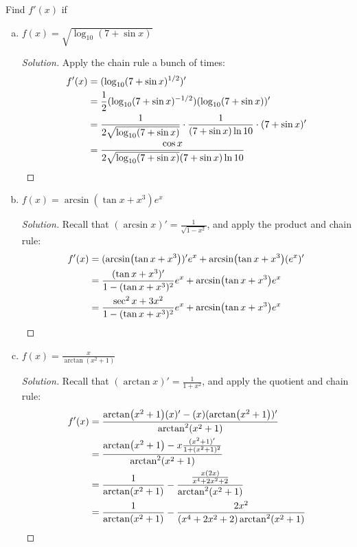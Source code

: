 \question Find $f'(x)$ if
\begin{enumerate}[(a)]
  \item $f(x)=\sqrt{\log_{10}(7+\sin x)}$
        \begin{proof}[Solution]
          Apply the chain rule a bunch of times:
          \begin{align*}
            f'(x) & = (\log_{10}(7+\sin x)^{1/2})'                                                         \\
                  & = \frac12(\log_{10}(7+\sin x)^{-1/2})(\log_{10}(7+\sin x))'                            \\
                  & = \frac{1}{2\sqrt{\log_{10}(7+\sin x)}}\cdot\frac{1}{(7+\sin x)\ln 10}\cdot(7+\sin x)' \\
                  & = \frac{\cos x}{2\sqrt{\log_{10}(7+\sin x)}(7+\sin x)\ln 10} \qedhere
          \end{align*}
        \end{proof}
  \item $f(x)=\arcsin(\tan x+x^3)e^x$
        \begin{proof}[Solution]
          Recall that $(\arcsin x)' = \frac{1}{\sqrt{1-x^2}}$, and apply the product and chain rule:
          \begin{align*}
            f'(x) & = (\arcsin(\tan x+x^3))'e^x + \arcsin(\tan x+x^3)(e^x)'                         \\
                  & = \frac{(\tan x+x^3)'}{1-(\tan x+x^3)^2}e^x + \arcsin(\tan x+x^3)e^x            \\
                  & = \frac{\sec^2 x + 3x^2}{1-(\tan x+x^3)^2}e^x + \arcsin(\tan x+x^3)e^x \qedhere
          \end{align*}
        \end{proof}
  \item $f(x)=\frac{x}{\arctan(x^2+1)}$
        \begin{proof}[Solution]
          Recall that $(\arctan x)' = \frac{1}{1+x^2}$, and apply the quotient and chain rule:
          \begin{align*}
            f'(x) & = \frac{\arctan(x^2+1)(x)' - (x)(\arctan(x^2+1))'}{\arctan^2(x^2+1)}            \\
                  & = \frac{\arctan(x^2+1) - x\frac{(x^2+1)'}{1+(x^2+1)^2}}{\arctan^2(x^2+1)}       \\
                  & = \frac{1}{\arctan(x^2+1)} - \frac{\frac{x(2x)}{x^4+2x^2+2}}{\arctan^2(x^2+1)}  \\
                  & = \frac{1}{\arctan(x^2+1)} - \frac{2x^2}{(x^4+2x^2+2)\arctan^2(x^2+1)} \qedhere
          \end{align*}
        \end{proof}
\end{enumerate}


